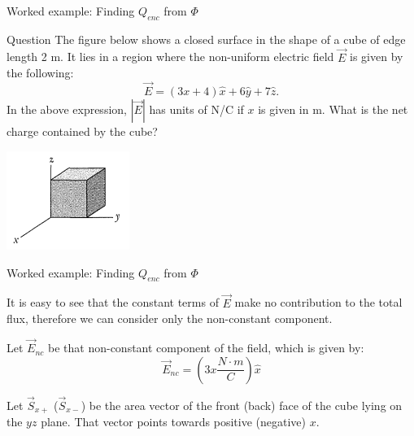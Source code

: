 %
%

{
\problemslide

%
%
%

\begin{frame}{Worked example: Finding $Q_{enc}$ from $\Phi$}

  \begin{blockexmplque}{Question}
    The figure below shows a closed surface in the shape of a cube of
    edge length 2 m. It lies in a region where the non-uniform electric field
    $\vec{E}$ is given by the following:
    \begin{equation*}
      \vec{E} = (3x+4)\hat{x} + 6\hat{y} + 7\hat{z}.
    \end{equation*}
    In the above expression, $|\vec{E}|$ has units of N/C if $x$ is given in m.
    What is the net charge contained by the cube?
    \begin{center}
        \includegraphics[width=0.30\textwidth]{./images/problems/lect02_cube.png}
    \end{center}
  \end{blockexmplque}

\end{frame}

%
%
%

\begin{frame}{Worked example: Finding $Q_{enc}$ from $\Phi$}

  It is easy to see that the constant terms of $\vec{E}$ make no contribution
  to the total flux, therefore we can consider only the non-constant component.\\
  \vspace{0.3cm}

  Let $\vec{E}_{nc}$ be that non-constant component of the field,
  which is given by:
  \begin{equation*}
  	\vec{E}_{nc} = (3x \frac{N \cdot m}{C}) \hat{x}
  \end{equation*}

  Let $\vec{S}_{x+}$ ($\vec{S}_{x-}$) be the area vector of the front (back)
  face of the cube lying on the $yz$ plane. That vector points towards
  positive (negative) $x$.\\
  \vspace{0.3cm}


\end{frame}}
